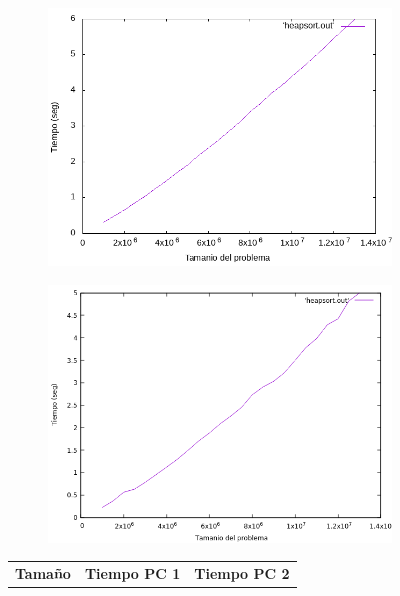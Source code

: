 \documentclass[12pt,spanish]{article}
\begin{document}
\begin{figure}[H]
\centering
\begin{subfigure}[b]{0.45\textwidth}
\includegraphics[scale=0.45]{empirica_heapsort.png}
\caption{}
\end{subfigure}
\quad
\begin{subfigure}[b]{0.45\textwidth}
\includegraphics[scale=0.45]{empirica_heapsort_2.png}
\caption{}
\end{subfigure}
\newline
\newline
\begin{tabular}{|c|c|c|}
\hline
\textbf{Tamaño} & \textbf{Tiempo PC 1} & \textbf{Tiempo PC 2} \\

\end{tabular}
\end{figure}
\end{document}

